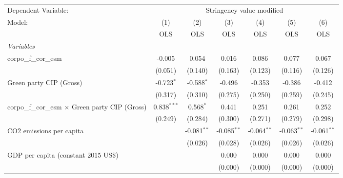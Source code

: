 
\begingroup
\centering
\begin{tabular}{lcccccc}
   \toprule
   Dependent Variable: & \multicolumn{6}{c}{Stringency value modified}\\
   Model:                                                  & (1)           & (2)           & (3)           & (4)           & (5)           & (6)\\  
                                                           &  OLS          & OLS           & OLS           & OLS           & OLS           & OLS\\  
   \midrule
   \emph{Variables}\\
   corpo\_f\_cor\_esm                                      & -0.005        & 0.054         & 0.016         & 0.086         & 0.077         & 0.067\\   
                                                           & (0.051)       & (0.140)       & (0.163)       & (0.123)       & (0.116)       & (0.126)\\   
   Green party CIP (Gross)                                 & -0.723$^{*}$  & -0.588$^{*}$  & -0.496        & -0.353        & -0.386        & -0.412\\   
                                                           & (0.317)       & (0.310)       & (0.275)       & (0.250)       & (0.259)       & (0.245)\\   
   corpo\_f\_cor\_esm $\times$ Green party CIP (Gross)     & 0.838$^{***}$ & 0.568$^{*}$   & 0.441         & 0.251         & 0.261         & 0.252\\   
                                                           & (0.249)       & (0.284)       & (0.300)       & (0.271)       & (0.279)       & (0.298)\\   
   CO2 emissions per capita                                &               & -0.081$^{**}$ & -0.085$^{**}$ & -0.064$^{**}$ & -0.063$^{**}$ & -0.061$^{**}$\\   
                                                           &               & (0.026)       & (0.028)       & (0.026)       & (0.026)       & (0.026)\\   
   GDP per capita (constant 2015 US\$)                     &               &               & 0.000         & 0.000         & 0.000         & 0.000\\   
                                                           &               &               & (0.000)       & (0.000)       & (0.000)       & (0.000)\\   

\end{tabular}
